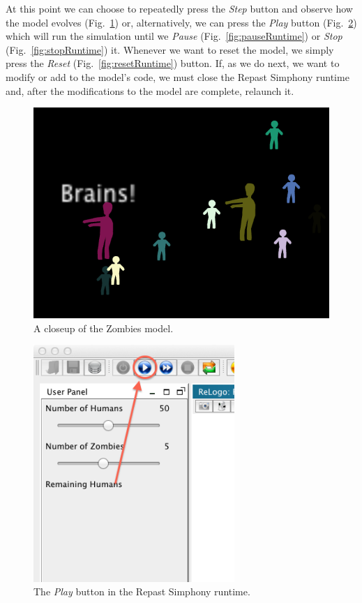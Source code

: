 \documentclass[11pt]{amsart}
\begin{document}
At this point we can choose to repeatedly press the \emph{Step} button and observe how the model evolves (Fig.~\ref{fig:brains}) or, alternatively, we can press the \emph{Play} button (Fig.~\ref{fig:playRuntime}) which will run the simulation until we \emph{Pause} (Fig.~\ref{fig:pauseRuntime}) or \emph{Stop} (Fig.~\ref{fig:stopRuntime}) it. Whenever we want to reset the model, we simply press the \emph{Reset} (Fig.~\ref{fig:resetRuntime}) button. If, as we do next, we want to modify or add to the model's code, we must close the Repast Simphony runtime and, after the modifications to the model are complete, relaunch it.

\begin{figure}
\begin{center}
\vspace{.2in}
\centerline {
\includegraphics[width=5in]{GettingStartedImages/Brains.png}
}
\caption{A closeup of the Zombies model.}
\label{fig:brains}
\end{center}
\end{figure}

\begin{figure}
\begin{center}
\vspace{.2in}
\centerline {
\includegraphics[width=3in]{GettingStartedImages/PlayRuntime.png}
}
\caption{The \emph{Play} button in the Repast Simphony runtime.}
\label{fig:playRuntime}
\end{center}
\end{figure}
\end{document}
